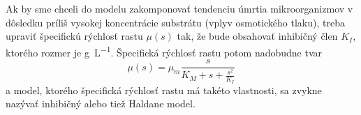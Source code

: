 Ak by sme chceli do modelu zakomponovať tendenciu úmrtia mikroorganizmov v dôsledku príliš vysokej koncentrácie substrátu (vplyv osmotického tlaku), treba upraviť špecifickú rýchlosť rastu $\mu(s)$ tak, že bude obsahovať inhibičný člen $ K_I $, ktorého rozmer je \si{\gram\per\liter}. Špecifická rýchlosť rastu potom nadobudne tvar
\begin{equation}
\mu(s) = \mu_{m}\frac{s}{K_{M} + s + \frac{s^2}{K_I}} \label{eq:spec_growth_rate_Haldane}
\end{equation}
a model, ktorého špecifická rýchlosť rastu má takéto vlastnosti, sa zvykne nazývať inhibičný alebo tiež Haldane model. 
